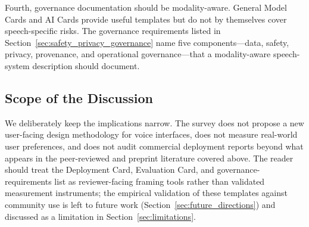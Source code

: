 Fourth, governance documentation should be modality-aware. General
Model Cards \citep{mitchell2019modelcards} and AI Cards
\citep{golpayegani2024aicardsappliedframework} provide useful templates
but do not by themselves cover speech-specific risks. The governance
requirements listed in Section~\ref{sec:safety_privacy_governance}
name five components---data, safety, privacy, provenance, and
operational governance---that a modality-aware speech-system
description should document.

\subsection{Scope of the Discussion}
\label{subsec:discussion_scope}

We deliberately keep the implications narrow. The survey does not
propose a new user-facing design methodology for voice interfaces,
does not measure real-world user preferences, and does not audit
commercial deployment reports beyond what appears in the peer-reviewed
and preprint literature covered above. The reader should treat the
Deployment Card, Evaluation Card, and governance-requirements list as
reviewer-facing framing tools rather than validated measurement
instruments; the empirical validation of these templates against
community use is left to future work
(Section~\ref{sec:future_directions}) and discussed as a limitation in
Section~\ref{sec:limitations}.
